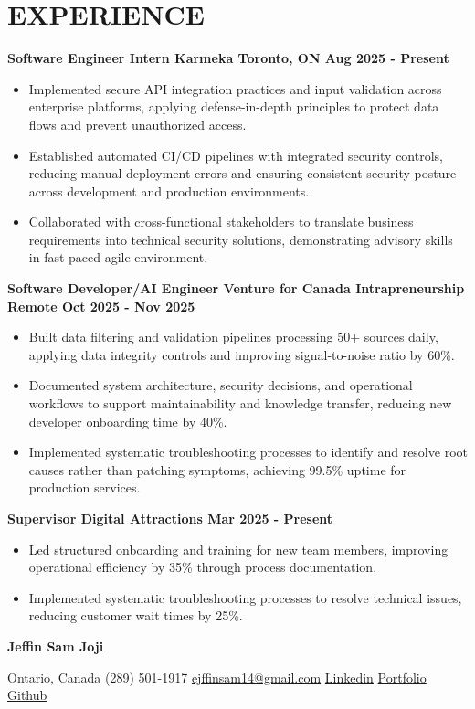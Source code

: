 \documentclass[11pt]{article}
\begin{document}
\section*{EXPERIENCE}
\textbf{Software Engineer Intern \textbar{} Karmeka \textbar{} Toronto, ON \textbar{} Aug 2025 - Present} 
\begin{itemize}[ leftmargin=1.5em,  topsep=0pt,itemsep=0pt, parsep=0pt]
\item    Implemented secure API integration practices and input validation across enterprise platforms, applying defense-in-depth principles to protect data flows and prevent unauthorized access.
\item    Established automated CI/CD pipelines with integrated security controls, reducing manual deployment errors and ensuring consistent security posture across development and production environments.
\item    Collaborated with cross-functional stakeholders to translate business requirements into technical security solutions, demonstrating advisory skills in fast-paced agile environment.

\end{itemize}
\textbf{Software Developer/AI Engineer \textbar{} Venture for Canada Intrapreneurship \textbar{} Remote \textbar{} Oct 2025 - Nov 2025} 
\begin{itemize}[ leftmargin=1.5em,  topsep=0pt,itemsep=0pt, parsep=0pt]
\item    Built data filtering and validation pipelines processing 50+ sources daily, applying data integrity controls and improving signal-to-noise ratio by 60\%.
\item    Documented system architecture, security decisions, and operational workflows to support maintainability and knowledge transfer, reducing new developer onboarding time by 40\%.
\item    Implemented systematic troubleshooting processes to identify and resolve root causes rather than patching symptoms, achieving 99.5\% uptime for production services.

\end{itemize}
\textbf{Supervisor \textbar{} Digital Attractions \textbar{} Mar 2025 - Present} 
\begin{itemize}[ leftmargin=1.5em,  topsep=0pt,itemsep=0pt, parsep=0pt]
\item    Led structured onboarding and training for new team members, improving operational efficiency by 35\% through process documentation.
\item    Implemented systematic troubleshooting processes to resolve technical issues, reducing customer wait times by 25\%.

\end{itemize}
\newpage
\begin{center}
    {\Huge \textbf{Jeffin Sam Joji}}

 Ontario, Canada \textbar{} (289) 501-1917 \textbar{} \href{mailto:ejffinsam14@gmail.com}{ejffinsam14@gmail.com} \textbar{} \href{https://linkedin.com/in/jeffin-sam-joji}{Linkedin} \textbar{} \href{https://jeff13in.github.io/Portfolio/}{Portfolio} \textbar{} \href{https://github.com/jeff13in}{Github}
\end{center}
\end{document}
